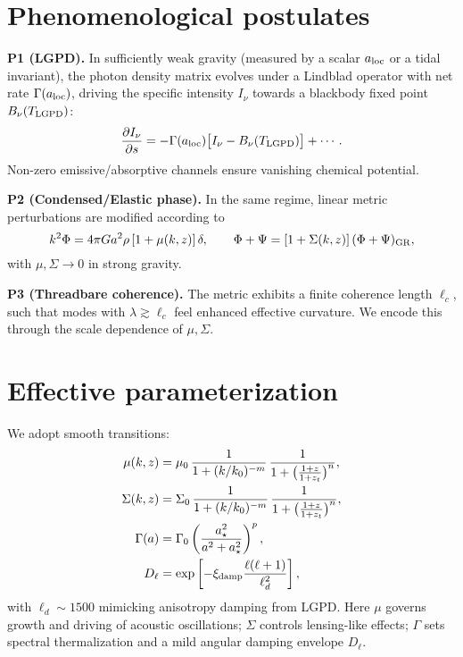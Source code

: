 \documentclass[11pt]{article}
\begin{document}
\section{Phenomenological postulates}
\textbf{P1 (LGPD).} In sufficiently weak gravity (measured by a scalar $a_{\rm loc}$ or a tidal invariant), the photon density matrix evolves under a Lindblad operator with net rate $\Gamma(a_{\rm loc})$, driving the specific intensity $I_\nu$ towards a blackbody fixed point $B_\nu(T_{\rm LGPD})$:
\begin{equation}
\frac{\partial I_\nu}{\partial s} = -\Gamma(a_{\rm loc})\big[I_\nu - B_\nu(T_{\rm LGPD})\big] + \cdots .
\end{equation}
Non-zero emissive/absorptive channels ensure vanishing chemical potential.

\noindent
\textbf{P2 (Condensed/Elastic phase).} In the same regime, linear metric perturbations are modified according to
\begin{equation}
k^2\Phi = 4\pi G a^2 \rho \,[1+\mu(k,z)]\,\delta, \qquad
\Phi+\Psi = [1+\Sigma(k,z)]\,(\Phi+\Psi)_{\rm GR},
\end{equation}
with $\mu,\Sigma\to 0$ in strong gravity.

\noindent
\textbf{P3 (Threadbare coherence).} The metric exhibits a finite coherence length $\ell_c$, such that modes with $\lambda \gtrsim \ell_c$ feel enhanced effective curvature. We encode this through the scale dependence of $\mu,\Sigma$.

\section{Effective parameterization}
We adopt smooth transitions:
\begin{align}
\mu(k,z) &= \mu_0 \, \frac{1}{1+(k/k_0)^{-m}} \, \frac{1}{1+\big(\frac{1+z}{1+z_t}\big)^{n}}, \\
\Sigma(k,z) &= \Sigma_0 \, \frac{1}{1+(k/k_0)^{-m}} \, \frac{1}{1+\big(\frac{1+z}{1+z_t}\big)^{n}}, \\
\Gamma(a) &= \Gamma_0 \left(\frac{a_\star^2}{a^2 + a_\star^2}\right)^p, \\
D_\ell &= \exp\left[- \xi_{\rm damp} \frac{\ell(\ell+1)}{\ell_d^2}\right] ,
\end{align}
with $\ell_d\sim 1500$ mimicking anisotropy damping from LGPD.
Here $\mu$ governs growth and driving of acoustic oscillations; $\Sigma$ controls lensing-like effects; $\Gamma$ sets spectral thermalization and a mild angular damping envelope $D_\ell$.
\end{document}
